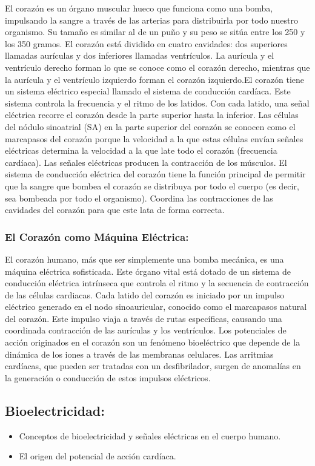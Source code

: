 El corazón es un órgano muscular hueco que funciona como una bomba, impulsando la sangre a través de las arterias para distribuirla por todo nuestro organismo. Su tamaño es similar al de un puño y su peso se sitúa entre los 250 y los 350 gramos. El corazón está dividido en cuatro cavidades: dos superiores llamadas aurículas y dos inferiores llamadas ventrículos. La aurícula y el ventrículo derecho forman lo que se conoce como el corazón derecho, mientras que la aurícula y el ventrículo izquierdo forman el corazón izquierdo.El corazón tiene un sistema eléctrico especial llamado el sistema de conducción cardíaca. Este sistema controla la frecuencia y el ritmo de los latidos. Con cada latido, una señal eléctrica recorre el corazón desde la parte superior hasta la inferior. Las células del nódulo sinoatrial (SA) en la parte superior del corazón se conocen como el marcapasos del corazón porque la velocidad a la que estas células envían señales eléctricas determina la velocidad a la que late todo el corazón (frecuencia cardíaca). Las señales eléctricas producen la contracción de los músculos. El sistema de conducción eléctrica del corazón tiene la función principal de permitir que la sangre que bombea el corazón se distribuya por todo el cuerpo (es decir, sea bombeada por todo el organismo). Coordina las contracciones de las cavidades del corazón para que este lata de forma correcta.

\subsubsection{El Corazón como Máquina Eléctrica:}

El corazón humano, más que ser simplemente una bomba mecánica, es una máquina eléctrica sofisticada. Este órgano vital está dotado de un sistema de conducción eléctrica intrínseca que controla el ritmo y la secuencia de contracción de las células cardiacas. Cada latido del corazón es iniciado por un impulso eléctrico generado en el nodo sinoauricular, conocido como el marcapasos natural del corazón. Este impulso viaja a través de rutas específicas, causando una coordinada contracción de las aurículas y los ventrículos. Los potenciales de acción originados en el corazón son un fenómeno bioeléctrico que depende de la dinámica de los iones a través de las membranas celulares. Las arritmias cardíacas, que pueden ser tratadas con un desfibrilador, surgen de anomalías en la generación o conducción de estos impulsos eléctricos.

\subsection{Bioelectricidad:}
\begin{itemize}
    \item Conceptos de bioelectricidad y señales eléctricas en el cuerpo humano.
    \item El origen del potencial de acción cardíaca.
\end{itemize}

